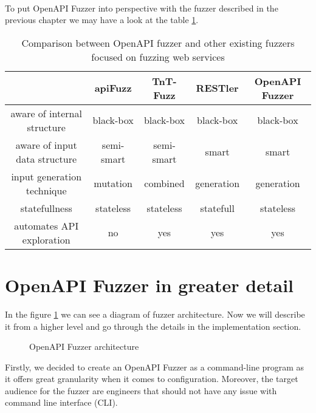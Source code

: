 \paragraph{}
To put OpenAPI Fuzzer into perspective with the fuzzer described in the previous chapter we may have a look at the table \ref{table:openapi-fuzzers-comparison}.

\begin{table}[h]
\begin{center}
\begin{tabular}{|c|c c c c|}
\hline
                              & apiFuzz    & TnT-Fuzz   & RESTler    & \textbf{OpenAPI Fuzzer} \\
\hline
aware of internal structure   & black-box  & black-box  & black-box  & black-box               \\
aware of input data structure & semi-smart & semi-smart & smart      & smart                   \\
input generation technique    & mutation   & combined   & generation & generation              \\
statefullness                 & stateless  & stateless  & statefull  & stateless               \\
automates API exploration     & no         & yes        & yes        & yes                     \\
\hline
\end{tabular}
\caption{Comparison between OpenAPI fuzzer and other existing fuzzers focused on fuzzing web services}
\label{table:openapi-fuzzers-comparison}
\end{center}
\end{table}

\newpage
\section{OpenAPI Fuzzer in greater detail}
In the figure \ref{fig:fuzzer-architecture} we can see a diagram of fuzzer architecture. Now we will describe it from a higher level and go through the details in the implementation section.

\begin{figure}[h]
    \center
    \def\svgwidth{\columnwidth}
    \scalebox{0.7}{}
    \caption{OpenAPI Fuzzer architecture}
    \label{fig:fuzzer-architecture}
\end{figure}

Firstly, we decided to create an OpenAPI Fuzzer as a command-line program as it offers great granularity when it comes to configuration. Moreover, the target audience for the fuzzer are engineers that should not have any issue with command line interface (CLI).

